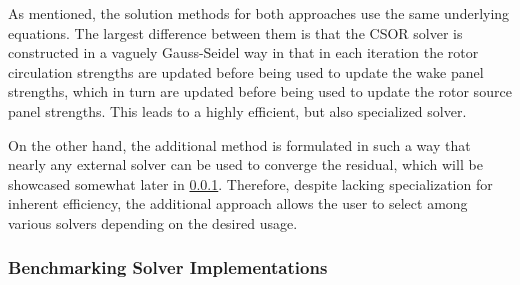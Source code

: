 As mentioned, the solution methods for both approaches use the same underlying equations.
%
The largest difference between them is that the CSOR solver is constructed in a vaguely Gauss-Seidel way in that in each iteration the rotor circulation strengths are updated before being used to update the wake panel strengths, which in turn are updated before being used to update the rotor source panel strengths.
%
This leads to a highly efficient, but also specialized solver.

On the other hand, the additional method is formulated in such a way that nearly any external solver can be used to converge the residual, which will be showcased somewhat later in \cref{ssec:benchmarking}.
%
Therefore, despite lacking specialization for inherent efficiency, the additional approach allows the user to select among various solvers depending on the desired usage.

\subsubsection{Benchmarking Solver Implementations}
\label{ssec:benchmarking}

